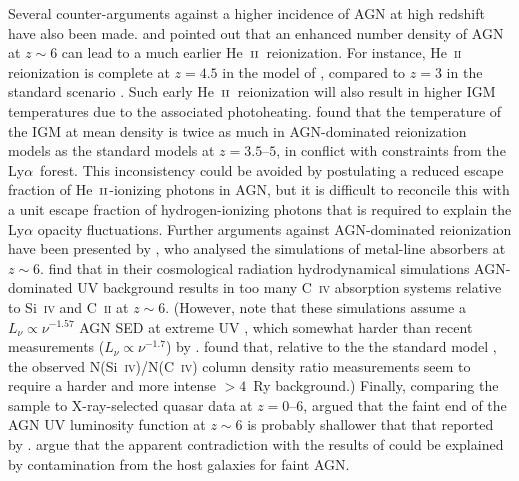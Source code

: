 \documentclass[fleqn,usenatbib]{mnras}
\def\lya{Ly$\alpha$~}
\def\HeII{\hbox{He~$\scriptstyle\rm II$}}
\begin{document}
Several counter-arguments against a higher incidence of AGN at high
redshift have also been made. \citet{2017MNRAS.468.4691D} and
\citet{2018MNRAS.473.1416M} pointed out that an enhanced number
density of AGN at $z\sim 6$ can lead to a much earlier
\HeII\ reionization.  For instance, He~\textsc{ii} reionization is
complete at $z=4.5$ in the model of \citet{2015ApJ...813L...8M},
compared to $z=3$ in the standard scenario
\citep{2012ApJ...746..125H}.  Such early \HeII\ reionization will also
result in higher IGM temperatures due to the associated photoheating.
\citet{2017MNRAS.468.4691D} found that the temperature of the IGM at
mean density is twice as much in AGN-dominated reionization models as
the standard models at $z=3.5$--$5$, in conflict with constraints from
the \lya forest.  This inconsistency could be avoided by postulating a
reduced escape fraction of \HeII-ionizing photons in AGN, but it is
difficult to reconcile this with a unit escape fraction of
hydrogen-ionizing photons that is required to explain the Ly$\alpha$
opacity fluctuations.  Further arguments against AGN-dominated
reionization have been presented by \citet{2016MNRAS.459.2299F}, who
analysed the simulations of metal-line absorbers at $z\sim 6$.
\citet{2016MNRAS.459.2299F} find that in their cosmological radiation
hydrodynamical simulations AGN-dominated UV background results in too
many C~\textsc{iv} absorption systems relative to Si~\textsc{iv} and
C~\textsc{ii} at $z\sim 6$.  (However, note that these simulations
assume a $L_\nu\propto\nu^{-1.57}$ AGN SED at extreme UV
\citep{2002ApJ...565..773T}, which somewhat harder than recent
measurements ($L_\nu\propto\nu^{-1.7}$) by
\citet{2015MNRAS.449.4204L}.  \citet{2016MNRAS.459.2299F} found that,
relative to the the standard model \citep{2012ApJ...746..125H}, the
observed N(Si~\textsc{iv})/N(C~\textsc{iv}) column density ratio
measurements seem to require a harder and more intense $>4$~Ry
background.)  Finally, comparing the \citet{2015AA...578A..83G} sample
to X-ray-selected quasar data at $z=0$--$6$,
\citet{2017MNRAS.465.1915R} argued that the faint end of the AGN UV
luminosity function at $z\sim 6$ is probably shallower that that
reported by \citet{2015AA...578A..83G}.  \citet{2017MNRAS.465.1915R}
argue that the apparent contradiction with the results of
\citet{2015AA...578A..83G} could be explained by contamination from
the host galaxies for faint AGN.

\end{document}
